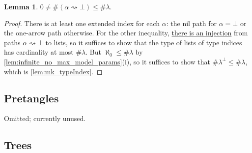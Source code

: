 \documentclass{article}
\newcommand{\mlem}[3]{\href{https://leanprover-community.github.io/mathlib4\_docs/Mathlib/#1.html\##2}{#3}}
\theoremstyle{definition}
\newtheorem{lemma}[theorem]{Lemma}
\theoremstyle{remark}
\begin{document}
\begin{lemma}
    \label{lem:mk_extendedIndex}
    \( 0 \neq \#(\alpha \rightsquigarrow \bot) \leq \#\lambda \).
\end{lemma}
\begin{proof}
    There is at least one extended index for each \( \alpha \): the nil path for \( \alpha = \bot \) or the one-arrow path otherwise.
    For the other inequality, \mlem{Combinatorics/Quiver/Path}{Quiver.Path.toList}{there is an injection} from paths \( \alpha \rightsquigarrow \bot \) to lists, so it suffices to show that the type of lists of type indices has cardinality at most \( \#\lambda \).
    But \( \aleph_0 \leq \#\lambda \) by \ref{lem:infinite_no_max_model_params}(i), so it suffices to show that \( \#\lambda^\bot \leq \#\lambda \), which is \ref{lem:mk_typeIndex}.
\end{proof}

\subsection{Pretangles}

Omitted; currently unused.

\subsection{Trees}
\end{document}
